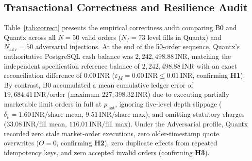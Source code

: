 \documentclass[12pt]{article}
\newcommand{\thinunit}[2]{#1\,\text{#2}}
\begin{document}
\subsection{Transactional Correctness and Resilience Audit}
Table~\ref{tab:correct} presents the empirical correctness audit comparing B0 and Quantx across all $N=50$ valid orders ($N_f=73$ level fills in Quantx) and $N_{\mathrm{adv}}=50$ adversarial injections. At the end of the 50-order sequence, Quantx's authoritative PostgreSQL cash balance was $\thinunit{2{,}242{,}498.88}{INR}$, matching the independent specification reference balance of $\thinunit{2{,}242{,}498.88}{INR}$ with an exact reconciliation difference of $\thinunit{0.00}{INR}$ ($\varepsilon_M = \thinunit{0.00}{INR} \le \thinunit{0.01}{INR}$, confirming \textbf{H1}). By contrast, B0 accumulated a mean cumulative ledger error of $\thinunit{19{,}684.41}{INR/order}$ (maximum $\thinunit{227{,}398.32}{INR}$) due to executing partially marketable limit orders in full at $p_{\mathrm{last}}$, ignoring five-level depth slippage ($\delta_p = \thinunit{1.60}{INR/share}$ mean, $\thinunit{9.51}{INR/share}$ max), and omitting statutory charges ($\thinunit{33.08}{INR/fill}$ mean, $\thinunit{116.01}{INR/fill}$ max). Under the Adversarial profile, Quantx recorded zero stale market-order executions, zero older-timestamp quote overwrites ($O=0$, confirming \textbf{H2}), zero duplicate effects from repeated idempotency keys, and zero accepted invalid orders (confirming \textbf{H3}).
\end{document}
